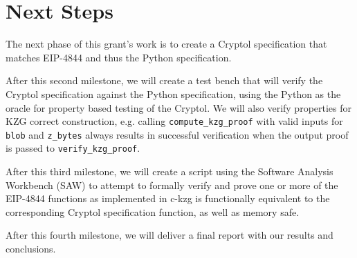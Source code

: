 \documentclass[12pt]{galois-whitepaper}
\begin{document}
\newpage
\section{Next Steps}
The next phase of this grant's work is to create a Cryptol specification that matches EIP-4844 and thus the Python specification.

After this second milestone, we will create a test bench that will verify the Cryptol specification against the Python specification, 
using the Python as the oracle for property based testing of the Cryptol. We will also verify properties for KZG correct construction,
e.g. calling \texttt{compute\_kzg\_proof} with valid inputs for \texttt{blob} and \texttt{z\_bytes} always results in successful 
verification when the output proof is passed to \texttt{verify\_kzg\_proof}.

After this third milestone, we will create a script using the Software Analysis Workbench (SAW) to attempt to formally verify and 
prove one or more of the EIP-4844 functions as implemented in c-kzg is functionally equivalent to the corresponding Cryptol 
specification function, as well as memory safe.

After this fourth milestone, we will deliver a final report with our results and conclusions.
\end{document}
